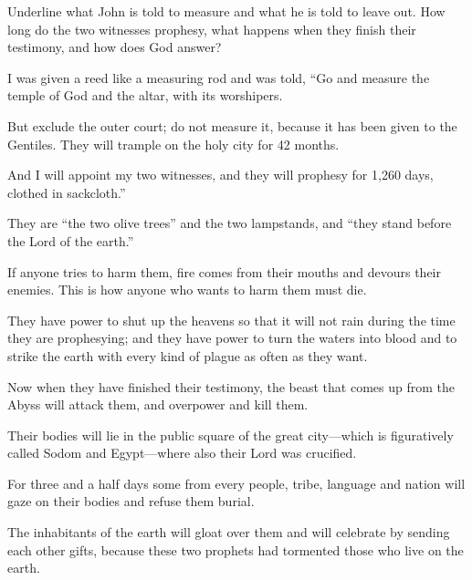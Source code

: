 \begin{ScriptureBox2}{Underline what John is told to measure and what he is told to leave out. How long do the two witnesses prophesy, what happens when they finish their testimony, and how does God answer?}

\item[11:1] I was given a reed like a measuring rod and was told, ``Go and measure the temple of God and the altar, with its worshipers.

\item[11:2] But exclude the outer court; do not measure it, because it has been given to the Gentiles. They will trample on the holy city for 42 months.

\item[11:3] And I will appoint my two witnesses, and they will prophesy for 1,260 days, clothed in sackcloth.''

\item[11:4] They are ``the two olive trees'' and the two lampstands, and ``they stand before the Lord of the earth.''

\item[11:5] If anyone tries to harm them, fire comes from their mouths and devours their enemies. This is how anyone who wants to harm them must die.

\item[11:6] They have power to shut up the heavens so that it will not rain during the time they are prophesying; and they have power to turn the waters into blood and to strike the earth with every kind of plague as often as they want.

\item[11:7] Now when they have finished their testimony, the beast that comes up from the Abyss will attack them, and overpower and kill them.

\item[11:8] Their bodies will lie in the public square of the great city---which is figuratively called Sodom and Egypt---where also their Lord was crucified.

\item[11:9] For three and a half days some from every people, tribe, language and nation will gaze on their bodies and refuse them burial.

\item[11:10] The inhabitants of the earth will gloat over them and will celebrate by sending each other gifts, because these two prophets had tormented those who live on the earth.


\end{ScriptureBox2}
